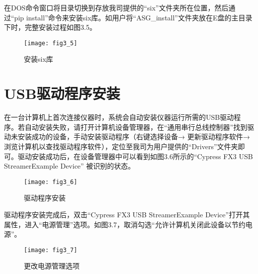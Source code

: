 在DOS命令窗口将目录切换到存放我司提供的“six”文件夹所在位置，然后通过“pip install”命令来安装six库。如用户将“ASG\_install”文件夹放在E盘的主目录下时，完整安装过程如图3.5。
\begin{figure}[H]
\centering
\texttt{[image: fig3\_5]}
\caption{安装six库}
\end{figure}

\section{USB\heiti 驱动程序安装}
在一台计算机上首次连接仪器时，系统会自动安装仪器运行所需的USB驱动程序。若自动安装失败，请打开计算机设备管理器，在“通用串行总线控制器”找到驱动未安装成功的设备，手动安装驱动程序（右键选择设备→ 更新驱动程序软件→浏览计算机以查找驱动程序软件），定位至我司为用户提供的“Drivers”文件夹即可。驱动安装成功后，在设备管理器中可以看到如图3.6所示的“Cypress FX3 USB StreamerExample Device” 被识别的状态。
\begin{figure}[htbp]
\centering
\texttt{[image: fig3\_6]}
\caption{驱动程序安装}
\end{figure}

驱动程序安装完成后，双击“Cypress FX3 USB StreamerExample Device”打开其属性，进入“电源管理”选项。如图3.7，取消勾选“允许计算机关闭此设备以节约电源”。
\begin{figure}[htbp]
\centering
\texttt{[image: fig3\_7]}
\caption{更改电源管理选项}
\end{figure}





